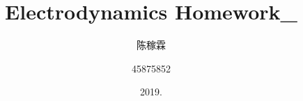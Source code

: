 \documentclass[10pt,a4paper]{article}
\title{Electrodynamics Homework\_}
\author{陈稼霖 \and 45875852}
\date{2019.}
\begin{document}
\maketitle
\section*{}
\subsection*{}
\end{document}
